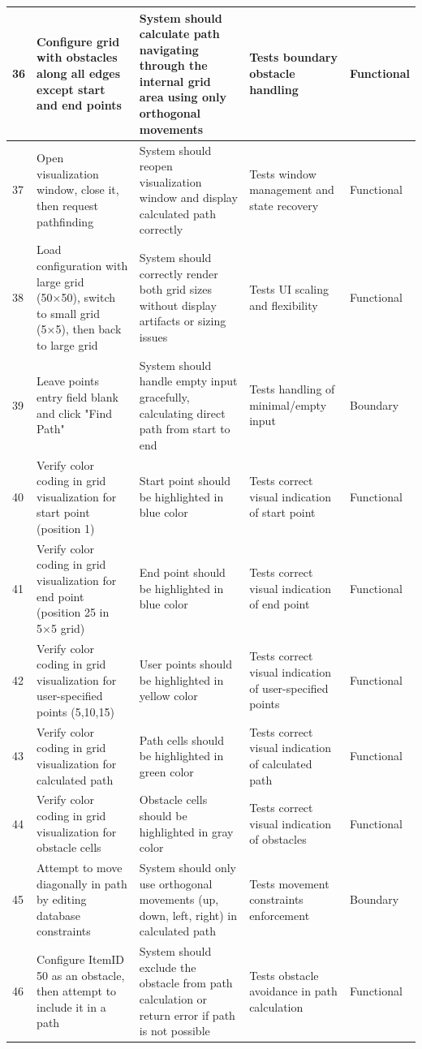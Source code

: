 \begin{longtable}{|p{}|p{}|p{}|p{}|p{}|}
\hline
36 & Configure grid with obstacles along all edges except start and end points & System should calculate path navigating through the internal grid area using only orthogonal movements & Tests boundary obstacle handling & Functional \\
\hline
37 & Open visualization window, close it, then request pathfinding & System should reopen visualization window and display calculated path correctly & Tests window management and state recovery & Functional \\
\hline
38 & Load configuration with large grid (50×50), switch to small grid (5×5), then back to large grid & System should correctly render both grid sizes without display artifacts or sizing issues & Tests UI scaling and flexibility & Functional \\
\hline
39 & Leave points entry field blank and click "Find Path" & System should handle empty input gracefully, calculating direct path from start to end & Tests handling of minimal/empty input & Boundary \\
\hline
40 & Verify color coding in grid visualization for start point (position 1) & Start point should be highlighted in blue color & Tests correct visual indication of start point & Functional \\
\hline
41 & Verify color coding in grid visualization for end point (position 25 in 5×5 grid) & End point should be highlighted in blue color & Tests correct visual indication of end point & Functional \\
\hline
42 & Verify color coding in grid visualization for user-specified points (5,10,15) & User points should be highlighted in yellow color & Tests correct visual indication of user-specified points & Functional \\
\hline
43 & Verify color coding in grid visualization for calculated path & Path cells should be highlighted in green color & Tests correct visual indication of calculated path & Functional \\
\hline
44 & Verify color coding in grid visualization for obstacle cells & Obstacle cells should be highlighted in gray color & Tests correct visual indication of obstacles & Functional \\
\hline
45 & Attempt to move diagonally in path by editing database constraints & System should only use orthogonal movements (up, down, left, right) in calculated path & Tests movement constraints enforcement & Boundary \\
\hline
46 & Configure ItemID 50 as an obstacle, then attempt to include it in a path & System should exclude the obstacle from path calculation or return error if path is not possible & Tests obstacle avoidance in path calculation & Functional \\

\end{longtable}
